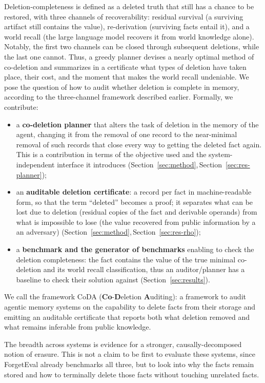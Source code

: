 \documentclass[letterpaper]{article}
\begin{document}
Deletion-completeness is defined as a deleted truth that still has a chance to be restored, with three channels of recoverability: residual survival (a surviving artifact still contains the value), re-derivation (surviving facts entail it), and a world recall (the large language model recovers it from world knowledge alone). Notably, the first two channels can be closed through subsequent deletions, while the last one cannot. Thus, a greedy planner devises a nearly optimal method of co-deletion and summarizes in a certificate what types of deletion have taken place, their cost, and the moment that makes the world recall undeniable. We pose the question of how to audit whether deletion is complete in memory, according to the three-channel framework described earlier. Formally, we contribute:

\begin{itemize}
\item a \textbf{co-deletion planner} that alters the task of deletion in the memory of the agent, changing it from the removal of one record to the near-minimal removal of such records that close every way to getting the deleted fact again. This is a contribution in terms of the objective used and the system-independent interface it introduces
(Section~\ref{sec:method},\,Section~\ref{sec:res-planner});
\item an \textbf{auditable deletion certificate}: a record per fact in machine-readable form, so that the term “deleted” becomes a proof; it separates what can be lost due to deletion (residual copies of the fact and derivable operands) from what is impossible to lose (the value recovered from public information by a an adversary) (Section~\ref{sec:method},\,Section~\ref{sec:res-rho});
\item a \textbf{benchmark and the generator of benchmarks} enabling to check the deletion completeness: the fact contains the value of the true minimal co-deletion and its world recall classification, thus an auditor/planner has a baseline to check their solution against (Section~\ref{sec:results}).
\end{itemize}

We call the framework CoDA (\textbf{Co}-\textbf{D}eletion \textbf{A}uditing): a
framework to audit agentic memory systems on the capability to delete facts from
their storage and emitting an auditable certificate that reports both what deletion removed and what remains inferable from public knowledge.

The breadth across systems is evidence for a stronger, causally-decomposed notion
of erasure. This is not a claim to be first to evaluate these systems, since ForgetEval
\citep{forgeteval} already benchmarks all three, but to look into why the facts remain stored 
and how to terminally delete those facts without touching unrelated facts.
\end{document}
